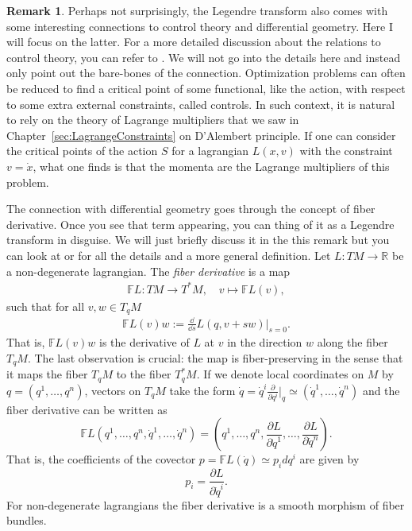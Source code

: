 \documentclass[english,fontsize=11pt,paper=b5]{scrbook}
\theoremstyle{definition}
\newtheorem{remark}{Remark}[chapter]
\begin{document}
    \begin{remark}
      Perhaps not surprisingly, the Legendre transform also comes with some interesting connections to control theory and differential geometry.
      Here I will focus on the latter. For a more detailed discussion about the relations to control theory, you can refer to \cite[Appendix II]{book:gelfand}.
      We will not go into the details here and instead only point out the bare-bones of the connection.
      Optimization problems can often be reduced to find a critical point of some functional, like the action, with respect to some extra external constraints, called controls.
      In such context, it is natural to rely on the theory of Lagrange multipliers that we saw in Chapter~\ref{sec:LagrangeConstraints} on D'Alembert principle.
      If one can consider the critical points of the action $S$ for a lagrangian $L(x,v)$ with the constraint $v=\dot x$, what one finds is that the momenta are the Lagrange multipliers of this problem.

      The connection with differential geometry goes through the concept of fiber derivative. Once you see that term appearing, you can thing of it as a Legendre transform in disguise. We will just briefly discuss it in the this remark but you can look at \cite[Chapter 7.2]{book:marsdenratiu} or \cite[Chapter 3.5]{book:amr} for all the details and a more general definition.
      Let $L:TM \to \mathbb{R}$ be a non-degenerate lagrangian. The \emph{fiber derivative} is a map
      \begin{align}
        \mathbb{F}L : TM \to T^*M, \quad v \mapsto \mathbb{F}L(v),
      \end{align}
      such that for all $v,w \in T_q M$
      \begin{align}
        \mathbb{F}L(v) w := \frac{\dd}{\dd s} L(q, v + s w) \big|_{s=0}.
      \end{align}
      That is, $\mathbb{F}L(v) w$ is the derivative of $L$ at $v$ in the direction $w$ along the fiber $T_qM$.
      The last observation is crucial: the map is fiber-preserving in the sense that it maps the fiber $T_qM$ to the fiber $T^*_qM$.
      If we denote local coordinates on $M$ by $q=(q^1, \ldots, q^n)$, vectors on $T_qM$ take the form $\dot q = \dot q^i \frac{\partial}{\partial q^i}\big|_q \simeq (\dot q^1, \ldots, \dot q^n)$ and the fiber derivative can be written as
      \begin{equation}
        \mathbb{F}L(q^1, \ldots, q^n, \dot q^1, \ldots,\dot q^n) = \left(q^1, \ldots, q^n, \frac{\partial L}{\partial \dot q^1}, \ldots, \frac{\partial L}{\partial \dot q^n}\right).
      \end{equation}
      That is, the coefficients of the covector $p = \mathbb{F}L(\dot q) \simeq p_i dq^i$ are given by
      \begin{equation}
        p_i = \frac{\partial L}{\partial \dot q^i}.
      \end{equation}
      For non-degenerate lagrangians the fiber derivative is a smooth morphism of fiber bundles.


\end{remark}
\end{document}
